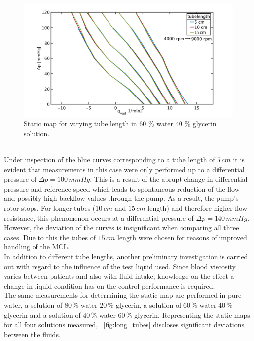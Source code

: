 \begin{figure}[ht]
  \centering
  \includegraphics[width=\textwidth]{images/chapt_4/60w40g_tube_length_new.pdf}
  \caption[Static map for different tube length in 60 \% water 40 \% glycerin solution]{Static map for varying tube length in 60 \% water 40 \% glycerin solution.}
  \label{fig:60w_40g}
\end{figure}
\\Under inspection of the blue curves corresponding to a tube length of $5\, cm$ it is evident that measurements in this case were only performed up to a differential pressure of $\Delta{p}=100 \, mmHg$. This is a result of the abrupt change in differential pressure and reference speed which leads to spontaneous reduction of the flow and possibly high backflow values through the pump. As a result, the pump's rotor stops. For longer tubes ($10\, cm$ and $15\, cm$ length) and therefore higher flow resistance, this phenomenon occurs at a differential pressure of $\Delta{p}=140\, mmHg$. However, the deviation of the curves is insignificant when comparing all three cases. Due to this the tubes of $15\, cm$ length were chosen for reasons of improved handling of the MCL.
\\In addition to different tube lengths, another preliminary investigation is carried out with regard to the influence of the test liquid used. Since blood viscosity varies between patients and also with fluid intake, knowledge on the effect a change in liquid condition has on the control performance is required.
\\The same measurements for determining the static map are performed in pure water, a solution of $80\, \%$ water $20\, \%$ glycerin, a solution of $60\, \%$ water $40\, \%$ glycerin and a solution of $40\, \%$ water $60\, \%$ glycerin. Representing the static maps for all four solutions measured, \figurename~\ref{fig:long_tubes} discloses significant deviations between the fluids.
